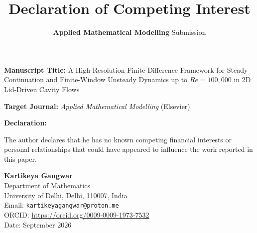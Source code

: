 \documentclass[11pt]{article}
\title{\textbf{Declaration of Competing Interest}}
\author{\textbf{Applied Mathematical Modelling} Submission}
\date{}
\begin{document}
\maketitle

\noindent\textbf{Manuscript Title:} A High-Resolution Finite-Difference Framework for Steady Continuation and Finite-Window Unsteady Dynamics up to $Re = 100{,}000$ in 2D Lid-Driven Cavity Flows

\vspace{1em}
\noindent\textbf{Target Journal:} \textit{Applied Mathematical Modelling} (Elsevier)

\vspace{1.5em}
\noindent\textbf{Declaration:}

\vspace{0.5em}
\noindent The author declares that he has no known competing financial interests or personal relationships that could have appeared to influence the work reported in this paper.

\vspace{2.5em}
\noindent\textbf{Kartikeya Gangwar} \\
Department of Mathematics \\
University of Delhi, Delhi, 110007, India \\
Email: \texttt{kartikeyagangwar@proton.me} \\
ORCID: \url{https://orcid.org/0009-0009-1973-7532} \\
Date: September 2026
\end{document}
